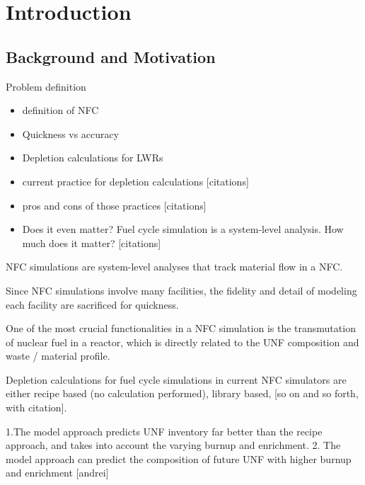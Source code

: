 \section{Introduction}
\subsection{Background and Motivation}
Problem definition

\begin{itemize}
    \item definition of NFC
    \item Quickness vs accuracy
    \item Depletion calculations for LWRs
    \item current practice for depletion calculations [citations]
    \item pros and cons of those practices [citations]
    \item Does it even matter? Fuel cycle simulation is a system-level analysis. How much does it matter? [citations]
\end{itemize}


\gls{NFC} simulations are system-level analyses that track
material flow in a \gls{NFC}. 

Since \gls{NFC} simulations
involve many facilities, the fidelity and detail of modeling each
facility are sacrificed for quickness. 

One of the most crucial functionalities in a \gls{NFC}
simulation is the transmutation of nuclear fuel in a reactor,
which is directly related to the \gls{UNF} composition
and waste / material profile.

Depletion calculations for fuel cycle simulations in current
\gls{NFC} simulators are either
recipe based (no calculation performed), 
library based, [so on and so forth, with citation].



1.The model approach predicts \gls{UNF} inventory far better than
the recipe approach, and takes into account the varying burnup and
enrichment.
2. The model approach can predict the composition of future
\gls{UNF} with higher burnup and enrichment [andrei]

\subsection{\Cyclus}






